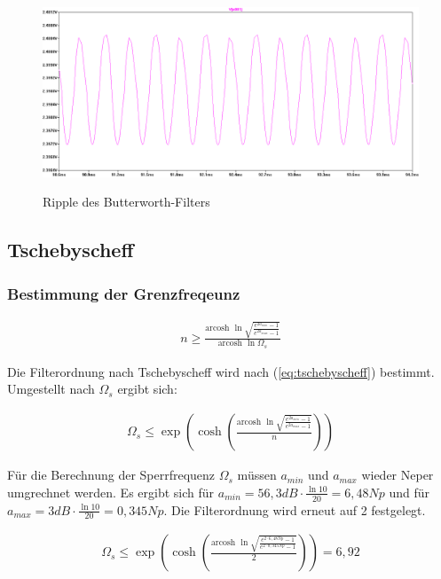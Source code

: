 \documentclass[11pt,twoside,openright]{mpreport}
\newcommand{\arcosh}{\mbox{arcosh }}
\begin{document}
\begin{figure}[H]
\centering
\includegraphics[width=.96\textwidth]{ripple.png}\\
\caption{Ripple des Butterworth-Filters}%
\label{fig:plott_ripple-bw}
\end{figure}



\subsection{Tschebyscheff}

\subsubsection{Bestimmung der Grenzfreqeunz}


\begin{align}
n \ge \frac{\arcosh{\ln{\sqrt{\frac{e^{2a_{min}}-1}{e^{2a_{max}}-1}}}}}{\arcosh \ln{\Omega_s}}
\label{eq:tschebyscheff}
\end{align}

Die Filterordnung nach Tschebyscheff wird nach (\ref{eq:tschebyscheff}) bestimmt. Umgestellt nach $\Omega_s$ ergibt sich:

\begin{align}
\Omega_s \le \exp{\left(\cosh{\left(\frac{\arcosh{\ln{\sqrt{\frac{e^{2a_{min}}-1}{e^{2a_{max}}-1}}}}}{n}\right)}\right)}
\end{align}


Für die Berechnung der Sperrfrequenz $\Omega_s$ müssen  $a_{min}$ und $a_{max}$ wieder Neper umgrechnet werden.
Es ergibt sich für $a_{min}=56,3 dB\cdot \frac{\ln{10}}{20}=6,48Np$ und für  $a_{max}=3 dB\cdot \frac{\ln{10}}{20}=0,345Np$. Die Filterordnung wird erneut auf 2 festgelegt.


\begin{align}
\Omega_s \le \exp{\left(\cosh{\left(\frac{\arcosh{\ln{\sqrt{\frac{e^{2\cdot 6,48Np}-1}{e^{2\cdot 0,345Np}-1}}}}}{2}\right)}\right)} = 6,92
\end{align}
\end{document}
